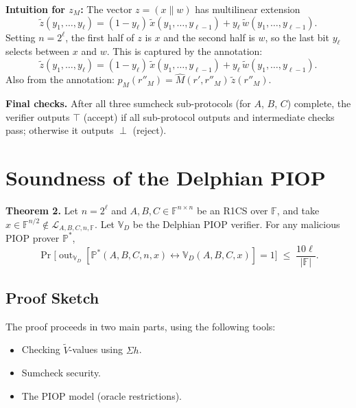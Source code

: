 \documentclass[11pt]{article}
\theoremstyle{plain}
\theoremstyle{definition}
\newcommand{\F}{\mathbb{F}}
\newcommand{\tildew}{\tilde{w}}
\newcommand{\tildex}{\tilde{x}}
\DeclareMathOperator{\out}{out}
\begin{document}
\begin{importantbox}
  \textbf{Intuition for $z_M$:} The vector $z = (x \| w)$ has multilinear extension
  \[
    \tilde{z}(y_1, \ldots, y_\ell)
    = (1 - y_\ell)\,\tildex(y_1,\ldots,y_{\ell-1})
      + y_\ell\,\tildew(y_1,\ldots,y_{\ell-1}).
  \]
  Setting $n = 2^\ell$, the first half of $z$ is $x$ and the second half is $w$, so the
  last bit $y_\ell$ selects between $x$ and $w$.  This is captured by the annotation:
  \[
    \tilde{z}(y_1,\ldots,y_\ell)
    = (1-y_\ell)\,\tildex(y_1,\ldots,y_{\ell-1})
      + y_\ell\,\tildew(y_1,\ldots,y_{\ell-1}).
  \]
  Also from the annotation: $p_M(r''_M) = \widehat{M}(r', r''_M)\,\tilde{z}(r''_M)$.
\end{importantbox}

\medskip
\noindent\textbf{Final checks.}  After all three sumcheck sub-protocols (for $A$, $B$, $C$)
complete, the verifier outputs $\top$ (accept) if all sub-protocol outputs and intermediate
checks pass; otherwise it outputs $\perp$ (reject).

\section{Soundness of the Delphian PIOP}

\begin{theorembox}
  \textbf{Theorem 2.}  Let $n = 2^\ell$ and $A, B, C \in \F^{n \times n}$ be an R1CS over
  $\F$, and take $x \in \F^{n/2} \notin \mathcal{L}_{A,B,C,n,\F}$.  Let $\mathbb{V}_D$ be
  the Delphian PIOP verifier.  For any malicious PIOP prover $\mathbb{P}^*$,
  \[
    \Pr\bigl[\out_{\mathbb{V}_D}[\mathbb{P}^*(A,B,C,n,x)
    \leftrightarrow \mathbb{V}_D(A,B,C,x)] = 1\bigr]
    \;\leq\; \frac{10\ell}{|\F|}.
  \]
\end{theorembox}

\subsection{Proof Sketch}

The proof proceeds in two main parts, using the following tools:
\begin{itemize}
  \item Checking $\tilde{V}$-values using $\Sigma h$.
  \item Sumcheck security.
  \item The PIOP model (oracle restrictions).
\end{itemize}
\end{document}
